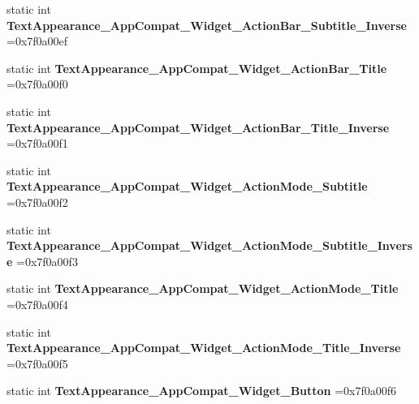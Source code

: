 \begin{DoxyCompactItemize}
static int {\bfseries Text\+Appearance\+\_\+\+App\+Compat\+\_\+\+Widget\+\_\+\+Action\+Bar\+\_\+\+Subtitle\+\_\+\+Inverse} =0x7f0a00ef
\item 
\mbox{\label{classandroid_1_1support_1_1v4_1_1R_1_1style_a034acc4b5162570033782ee177d541fa}} 
static int {\bfseries Text\+Appearance\+\_\+\+App\+Compat\+\_\+\+Widget\+\_\+\+Action\+Bar\+\_\+\+Title} =0x7f0a00f0
\item 
\mbox{\label{classandroid_1_1support_1_1v4_1_1R_1_1style_a51f4e659aa1d157b9e78ede1cceabd0e}} 
static int {\bfseries Text\+Appearance\+\_\+\+App\+Compat\+\_\+\+Widget\+\_\+\+Action\+Bar\+\_\+\+Title\+\_\+\+Inverse} =0x7f0a00f1
\item 
\mbox{\label{classandroid_1_1support_1_1v4_1_1R_1_1style_a95829b126f164447e3df6e5a549540f5}} 
static int {\bfseries Text\+Appearance\+\_\+\+App\+Compat\+\_\+\+Widget\+\_\+\+Action\+Mode\+\_\+\+Subtitle} =0x7f0a00f2
\item 
\mbox{\label{classandroid_1_1support_1_1v4_1_1R_1_1style_a3af2c1685c9d181211b15e903632152b}} 
static int {\bfseries Text\+Appearance\+\_\+\+App\+Compat\+\_\+\+Widget\+\_\+\+Action\+Mode\+\_\+\+Subtitle\+\_\+\+Inverse} =0x7f0a00f3
\item 
\mbox{\label{classandroid_1_1support_1_1v4_1_1R_1_1style_ae60325bd7f36e65466ff6311efb8787b}} 
static int {\bfseries Text\+Appearance\+\_\+\+App\+Compat\+\_\+\+Widget\+\_\+\+Action\+Mode\+\_\+\+Title} =0x7f0a00f4
\item 
\mbox{\label{classandroid_1_1support_1_1v4_1_1R_1_1style_a2e4389ed36739dc6437a1648f964c673}} 
static int {\bfseries Text\+Appearance\+\_\+\+App\+Compat\+\_\+\+Widget\+\_\+\+Action\+Mode\+\_\+\+Title\+\_\+\+Inverse} =0x7f0a00f5
\item 
\mbox{\label{classandroid_1_1support_1_1v4_1_1R_1_1style_a9a3cb06eac9d4302bf8875e7ec0828e5}} 
static int {\bfseries Text\+Appearance\+\_\+\+App\+Compat\+\_\+\+Widget\+\_\+\+Button} =0x7f0a00f6

\end{DoxyCompactItemize}
